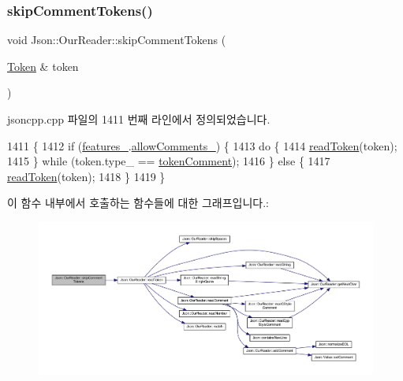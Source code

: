 \subsubsection{\texorpdfstring{skip\+Comment\+Tokens()}{skipCommentTokens()}}
{\footnotesize\ttfamily void Json\+::\+Our\+Reader\+::skip\+Comment\+Tokens (\begin{DoxyParamCaption}\item[{\hyperlink{class_json_1_1_our_reader_1_1_token}{Token} \&}]{token }\end{DoxyParamCaption})\hspace{0.3cm}{\ttfamily [private]}}



jsoncpp.\+cpp 파일의 1411 번째 라인에서 정의되었습니다.


\begin{DoxyCode}
1411                                               \{
1412   \textcolor{keywordflow}{if} (\hyperlink{class_json_1_1_our_reader_a2714302d5cc54ca2ce4118ea51c0397a}{features\_}.\hyperlink{class_json_1_1_our_features_ac71bb7ba7363d3b05ed76602b036ce33}{allowComments\_}) \{
1413     \textcolor{keywordflow}{do} \{
1414       \hyperlink{class_json_1_1_our_reader_a0d1e66da47fe2e85f5033c59326dfdc3}{readToken}(token);
1415     \} \textcolor{keywordflow}{while} (token.type\_ == \hyperlink{class_json_1_1_our_reader_a15116f7276ddf1e7a2cc3cbefa884dcca777fb6589fdbe225bc10a1e49a090da9}{tokenComment});
1416   \} \textcolor{keywordflow}{else} \{
1417     \hyperlink{class_json_1_1_our_reader_a0d1e66da47fe2e85f5033c59326dfdc3}{readToken}(token);
1418   \}
1419 \}
\end{DoxyCode}
이 함수 내부에서 호출하는 함수들에 대한 그래프입니다.\+:\nopagebreak
\begin{figure}[H]
\begin{center}
\leavevmode
\includegraphics[width=350pt]{class_json_1_1_our_reader_a856dea44d92578c276856d7a65a4ebdc_cgraph}
\end{center}
\end{figure}
